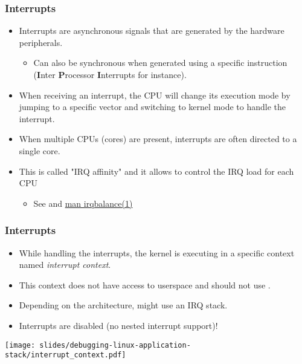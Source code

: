 \begin{frame}
  \frametitle{Interrupts}
  \begin{itemize}
    \item Interrupts are asynchronous signals that are generated by the hardware
          peripherals.
    \begin{itemize}
      \item Can also be synchronous when generated using a specific instruction
            ({\bf I}nter {\bf P}rocessor {\bf I}nterrupts for instance).
    \end{itemize}
    \item When receiving an interrupt, the CPU will change its execution mode by
          jumping to a specific vector and switching to kernel mode to handle the
          interrupt.
    \item When multiple CPUs (cores) are present, interrupts are often directed
          to a single core.
    \item This is called "IRQ affinity" and it allows to control the IRQ load for
          each CPU
    \begin{itemize}
      \item See  and
            \href{https://linux.die.net/man/1/irqbalance}{man irqbalance(1)}
    \end{itemize}
  \end{itemize}
\end{frame}

\begin{frame}
  \frametitle{Interrupts}
  \begin{itemize}
    \item While handling the interrupts, the kernel is executing in a
          specific context named {\em interrupt context}.
    \item This context does not have access to userspace and should not use
          .
    \item Depending on the architecture, might use an IRQ stack.
    \item Interrupts are disabled (no nested interrupt support)!
  \end{itemize}
  \begin{center}
    \texttt{[image: slides/debugging-linux-application-stack/interrupt\_context.pdf]}
  \end{center}
\end{frame}

